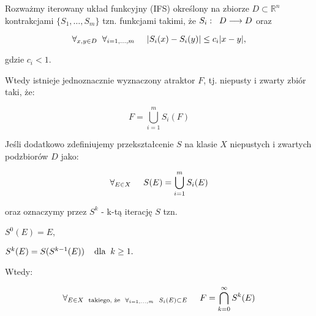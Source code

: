 \documentclass{mini}
\begin{document}


\begin{tw}

Rozważmy iterowany układ funkcyjny (IFS) określony na zbiorze 
$D \subset \mathbb{R}^{n}$ 
kontrakcjami 
$ \lbrace S_1, \ldots,S_m \rbrace $ 
tzn. funkcjami takimi, że 
$S_i: \hspace{2mm} D \longrightarrow D$ 
oraz

\begin{equation}
\forall_{x,y\in D} \hspace{2mm} \forall_{i=1,\ldots ,m} \hspace{5mm} \vert S_i(x)-S_i(y) \vert \leq c_i \vert x-y \vert, 
\end{equation}

gdzie $ c_i < 1 $.

Wtedy istnieje jednoznacznie wyznaczony atraktor $F$, tj. niepusty i zwarty zbiór taki, że:

\begin{equation}\label{d1}
F = \bigcup^{m}_{i=1}{S_i(F)} 
\end{equation}

Jeśli dodatkowo zdefiniujemy przekształcenie $S$ na klasie $X$ niepustych i zwartych podzbiorów $D$ jako:

\begin{equation}\label{d3}
\forall_{E \in X} \hspace{5mm} S(E) = \bigcup^{m}_{i=1} S_i(E)
\end{equation}

oraz oznaczymy przez $S^k$ - k-tą iterację $S$ tzn. 

$ S^0(E) = E $,

$ S^k(E) = S(S^{k-1}(E)) \hspace{4mm}\textrm{dla} \hspace{2mm} k \geq 1 \textrm{.}$

Wtedy:

\begin{equation}\label{d2}
\forall_{E \in X \hspace{2mm} \textrm{takiego, że} \hspace{2mm} \forall_{i=1,\ldots ,m} \hspace{2mm} S_i(E) \subset E} \hspace{5mm} F = \bigcap^{\infty}_{k=0} S^k(E)
\end{equation}

\end{tw}
\end{document}
